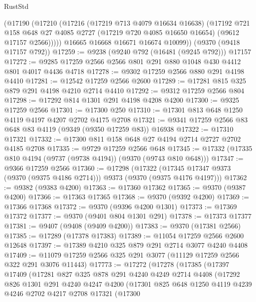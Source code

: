 \begin{lexlean}{RustStd}
\begin{coremodule}
{\begin{coremodule}
{{{{{{{{{{{{{{{{{{{{{{{{{{{{{{{{{{{{{{{        (@17190
          (@17210
            (@17216
              (@17219 @713 @4079 @16634 @16638)
              (@17192
                @721
                @158
                @648
                @27
                @4085
                @2727
                (@17219 @720 @4085 @16650 @16654)
                (@9612 @17157 @2566)))))
        @16665
        @16668
        @16671
        @16674
        @10099))
    (@9370 (@9418 @17157 @792))
@17259 := @9238 (@9240 @792 (@16481 (@9245 @792))) @17157
@17272 := @9285 @17259 @2566 @2566 @801 @291 @880 @1048 @430 @4412 @801 @4017 @4436 @4718
@17278 := @9302 @17259 @2566 @880 @291 @4198 @4410
@17281 := @12542 @17259 @2566 @2600
@17289 := @17281 @815 @325 @879 @291 @4198 @4210 @2714 @4410
@17292 := @9312 @17259 @2566 @804
@17298 := @17292 @814 @1301 @291 @4198 @4208 @4200
@17300 := @9325 @17259 @2566
@17301 := @17300 @250
@17310 := @17301 @813 @648 @1250 @4119 @4197 @4207 @2702 @4175 @2708
@17321 := @9341 @17259 @2566 @83 @648 @83 @4119 (@9349 (@9350 @17259 @83)) @16938
@17322 := @17310 @17321
@17332 := @17300 @811 @158 @648 @27 @4194 @2714 @2727 @2702 @4185 @2708
@17335 := @9729 @17259 @2566 @648
@17345 := @17332 (@17335 @810 @4194 (@9737 (@9738 @4194)) (@9370 (@9743 @810 @648)))
@17347 := @9366 @17259 @2566
@17360 := @17298
    (@17322 (@17345 @17347 @9373 (@9370 (@9375 @4186 @2714))) @9373 (@9370 (@9375 @4176 @4197)))
@17362 := @9382 (@9383 @4200)
@17363 := @17360 @17362
@17365 := @9370 (@9387 @4200)
@17366 := @17363 @17365
@17368 := @9370 (@9392 @4200)
@17369 := @17366 @17368
@17372 := @9370 (@9396 @4200 @1301)
@17373 := @17369 @17372
@17377 := @9370 (@9401 @804 @1301 @291)
@17378 := @17373 @17377
@17381 := @9407 (@9408 (@9409 @4200))
@17383 := @9370 (@17381 @2566)
@17385 := @17289 (@17378 @17383)
@17389 := @11054 @17259 @2566 @2600 @12648
@17397 := @17389 @4210 @325 @879 @291 @2714 @3077 @4240 @4408
@17409 := @11079 @17259 @2566 @325 @291 @3077 (@11129 @17259 @2566 @322 @291 @3076 @11443)
@17773 := @17272
    (@17278
      (@17385
        (@17397
          @17409
          (@17281
            @827
            @325
            @878
            @291
            @4240
            @4249
            @2714
            @4408
            (@17292
              @826
              @1301
              @291
              @4240
              @4247
              @4200
              (@17301
                @825
                @648
                @1250
                @4119
                @4239
                @4246
                @2702
                @4217
                @2708
                @17321
                (@17300
}}}}}}}}}}}}}}}}}}}}}}}}}}}}}}}}}}}}}}}
\end{coremodule}}
\end{coremodule}
\end{lexlean}
